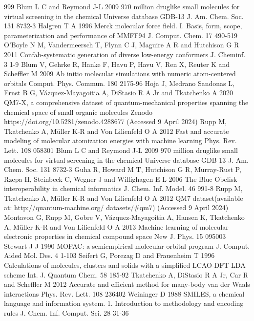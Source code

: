 \documentclass[12pt]{article}
\begin{document}
\begin{thebibliography}{999}
 Blum L C and Reymond J-L 2009 970 million druglike small molecules for virtual screening in the chemical Universe database GDB-13 J. Am. Chem. Soc. 131 8732-3
 Halgren T A 1996 Merck molecular force field. I. Basis, form, scope, parameterization and performance of MMFF94 J. Comput. Chem. 17 490-519
 O'Boyle N M, Vandermeersch T, Flynn C J, Maguire A R and Hutchison G R 2011 Confab-systematic generation of diverse low-energy conformers J. Cheminf. 3 1-9
 Blum V, Gehrke R, Hanke F, Havu P, Havu V, Ren X, Reuter K and Scheffler M 2009 Ab initio molecular simulations with numeric atom-centered orbitals Comput. Phys. Commun. 180 2175-96
 Hoja J, Medrano Sandonas L, Ernst B G, Vázquez-Mayagoitia A, DiStasio R A Jr and Tkatchenko A 2020 QM7-X, a comprehensive dataset of quantum-mechanical properties spanning the chemical space of small organic molecules Zenodo https://doi.org/10.5281/zenodo.4288677 (Accessed 9 April 2024)
 Rupp M, Tkatchenko A, Müller K-R and Von Lilienfeld O A 2012 Fast and accurate modeling of molecular atomization energies with machine learning Phys. Rev. Lett. 108 058301
 Blum L C and Reymond J-L 2009 970 million druglike small molecules for virtual screening in the chemical Universe database GDB-13 J. Am. Chem. Soc. 131 8732-3
 Guha R, Howard M T, Hutchison G R, Murray-Rust P, Rzepa H, Steinbeck C, Wegner J and Willighagen E L 2006 The Blue Obelisk--interoperability in chemical informatics J. Chem. Inf. Model. 46 991-8
 Rupp M, Tkatchenko A, Müller K-R and Von Lilienfeld O A 2012 QM7 dataset(available at: http://quantum-machine.org/ datasets/\#qm7) (Accessed 9 April 2024)
 Montavon G, Rupp M, Gobre V, Vázquez-Mayagoitia A, Hansen K, Tkatchenko A, Müller K-R and Von Lilienfeld O A 2013 Machine learning of molecular electronic properties in chemical compound space New J. Phys. 15 095003
 Stewart J J 1990 MOPAC: a semiempirical molecular orbital program J. Comput. Aided Mol. Des. 4 1-103
 Seifert G, Porezag D and Frauenheim T 1996 Calculations of molecules, clusters and solids with a simplified LCAO-DFT-LDA scheme Int. J. Quantum Chem. 58 185-92
 Tkatchenko A, DiStasio R A Jr, Car R and Scheffler M 2012 Accurate and efficient method for many-body van der Waals interactions Phys. Rev. Lett. 108 236402
 Weininger D 1988 SMILES, a chemical language and information system. 1. Introduction to methodology and encoding rules J. Chem. Inf. Comput. Sci. 28 31-36

\end{thebibliography}
\end{document}
